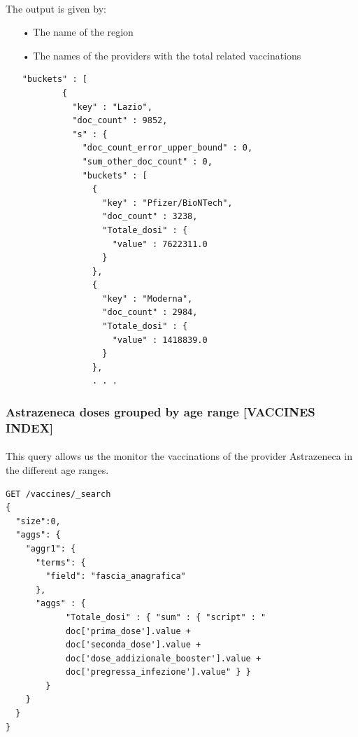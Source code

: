 \documentclass[a4paper,12pt]{article}
\begin{document}
\paragraph{} The output is given by: 
\begin{itemize}[noitemsep]
\item[•] The name of the region
\item[•] The names of the providers with the total related vaccinations
\begin{tcolorbox}[colback=red!5!white,colframe=red!75!black,title=OUTPUT]
\begin{verbatim}
"buckets" : [
        {
          "key" : "Lazio",
          "doc_count" : 9852,
          "s" : {
            "doc_count_error_upper_bound" : 0,
            "sum_other_doc_count" : 0,
            "buckets" : [
              {
                "key" : "Pfizer/BioNTech",
                "doc_count" : 3238,
                "Totale_dosi" : {
                  "value" : 7622311.0
                }
              },
              {
                "key" : "Moderna",
                "doc_count" : 2984,
                "Totale_dosi" : {
                  "value" : 1418839.0
                }
              },
              . . .
\end{verbatim}
\end{tcolorbox}
\end{itemize}
\newpage

\subsubsection{Astrazeneca doses grouped by age range [VACCINES INDEX]}
\paragraph{} This query allows us the monitor the vaccinations of the provider Astrazeneca in the different age ranges.
\begin{tcolorbox}[colback=green!5!white,colframe=green!75!black,title=QUERY]
\begin{verbatim}
GET /vaccines/_search
{
  "size":0,
  "aggs": {
    "aggr1": {
      "terms": {
        "field": "fascia_anagrafica"
      },
      "aggs" : {
            "Totale_dosi" : { "sum" : { "script" : "
            doc['prima_dose'].value + 
            doc['seconda_dose'].value + 
            doc['dose_addizionale_booster'].value + 
            doc['pregressa_infezione'].value" } }
        }
    }
  }
}
\end{verbatim}
\end{tcolorbox}
\newpage
\end{document}
